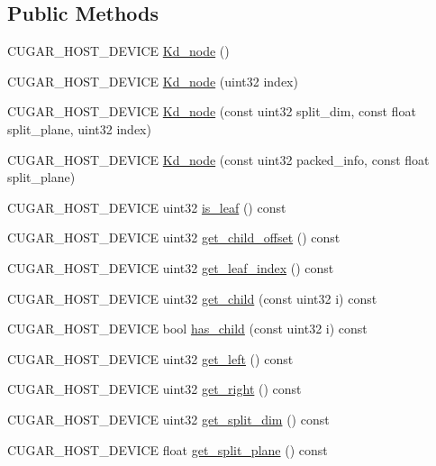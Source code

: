 \subsection*{Public Methods}
\begin{DoxyCompactItemize}
\item 
C\+U\+G\+A\+R\+\_\+\+H\+O\+S\+T\+\_\+\+D\+E\+V\+I\+CE \hyperlink{structcugar_1_1_kd__node_ad5ead6ff07b97abd9aa634e7e9f99b7a}{Kd\+\_\+node} ()
\item 
C\+U\+G\+A\+R\+\_\+\+H\+O\+S\+T\+\_\+\+D\+E\+V\+I\+CE \hyperlink{structcugar_1_1_kd__node_a20157f7254272d30fa6e0d47f1ba51f4}{Kd\+\_\+node} (uint32 index)
\item 
C\+U\+G\+A\+R\+\_\+\+H\+O\+S\+T\+\_\+\+D\+E\+V\+I\+CE \hyperlink{structcugar_1_1_kd__node_a6c9d0ecf8847c23d991546a50e15892f}{Kd\+\_\+node} (const uint32 split\+\_\+dim, const float split\+\_\+plane, uint32 index)
\item 
C\+U\+G\+A\+R\+\_\+\+H\+O\+S\+T\+\_\+\+D\+E\+V\+I\+CE \hyperlink{structcugar_1_1_kd__node_a3da9081824e772a481e022377aaacad5}{Kd\+\_\+node} (const uint32 packed\+\_\+info, const float split\+\_\+plane)
\item 
C\+U\+G\+A\+R\+\_\+\+H\+O\+S\+T\+\_\+\+D\+E\+V\+I\+CE uint32 \hyperlink{structcugar_1_1_kd__node_a09e523bbe223444568c141dd126f5a64}{is\+\_\+leaf} () const
\item 
C\+U\+G\+A\+R\+\_\+\+H\+O\+S\+T\+\_\+\+D\+E\+V\+I\+CE uint32 \hyperlink{structcugar_1_1_kd__node_a4f0d4d665d91dedcd4f09c710b7f4cc2}{get\+\_\+child\+\_\+offset} () const
\item 
C\+U\+G\+A\+R\+\_\+\+H\+O\+S\+T\+\_\+\+D\+E\+V\+I\+CE uint32 \hyperlink{structcugar_1_1_kd__node_a53fde970e64c8036c0fc48836a74199b}{get\+\_\+leaf\+\_\+index} () const
\item 
C\+U\+G\+A\+R\+\_\+\+H\+O\+S\+T\+\_\+\+D\+E\+V\+I\+CE uint32 \hyperlink{structcugar_1_1_kd__node_a89f3004fefa39c2b831719011b0b24da}{get\+\_\+child} (const uint32 i) const
\item 
C\+U\+G\+A\+R\+\_\+\+H\+O\+S\+T\+\_\+\+D\+E\+V\+I\+CE bool \hyperlink{structcugar_1_1_kd__node_a4cb804d9036a85775908d44b37e51967}{has\+\_\+child} (const uint32 i) const
\item 
C\+U\+G\+A\+R\+\_\+\+H\+O\+S\+T\+\_\+\+D\+E\+V\+I\+CE uint32 \hyperlink{structcugar_1_1_kd__node_a07e8c968391b6fde3cbe3b7d8dd91855}{get\+\_\+left} () const
\item 
C\+U\+G\+A\+R\+\_\+\+H\+O\+S\+T\+\_\+\+D\+E\+V\+I\+CE uint32 \hyperlink{structcugar_1_1_kd__node_af589d9046f918319d562c35dfaae8ba7}{get\+\_\+right} () const
\item 
C\+U\+G\+A\+R\+\_\+\+H\+O\+S\+T\+\_\+\+D\+E\+V\+I\+CE uint32 \hyperlink{structcugar_1_1_kd__node_a744e974427997c42d6399eed287d4bef}{get\+\_\+split\+\_\+dim} () const
\item 
C\+U\+G\+A\+R\+\_\+\+H\+O\+S\+T\+\_\+\+D\+E\+V\+I\+CE float \hyperlink{structcugar_1_1_kd__node_a64a4c5b431686be7e635ffd732543c7e}{get\+\_\+split\+\_\+plane} () const
\end{DoxyCompactItemize}

